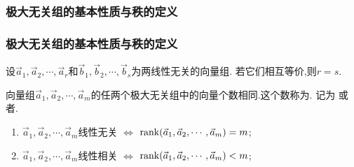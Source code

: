 \subsubsection{极大无关组的基本性质与秩的定义}
\begin{frame}\frametitle{极大无关组的基本性质与秩的定义}

\begin{theorem}
设$\vec{a}_1,\vec{a}_2,\cdots,\vec{a}_r$和$\vec{b}_1,\vec{b}_2,\cdots,\vec{b}_s$为两线性无关的向量组. 若它们相互等价,则$r=s$.
\end{theorem}
\pp
{}
\pp
\begin{corollary}
向量组$\vec{a}_1,\vec{a}_2,\cdots,\vec{a}_m$的任两个极大无关组中的向量个数相同.这个数称为.
记为
或者.
\end{corollary}
\pp
\begin{proposition}[用秩判定相关性]
\begin{enumerate}
\item $\vec{a}_1,\vec{a}_2,\cdots,\vec{a}_m$线性无关 $\Leftrightarrow$ $\operatorname{rank}(\vec{a}_1,\vec{a}_2,\cdots,\vec{a}_m)=m$;
\pp
\item $\vec{a}_1,\vec{a}_2,\cdots,\vec{a}_m$线性相关 $\Leftrightarrow$ $\operatorname{rank}(\vec{a}_1,\vec{a}_2,\cdots,\vec{a}_m)<m$;
\end{enumerate}
\end{proposition}
\end{frame}





